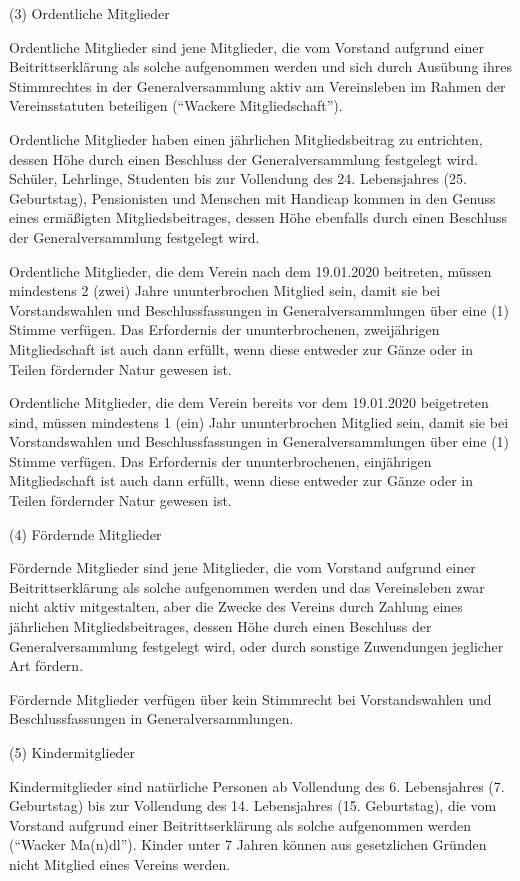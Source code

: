 \documentclass[11pt,a4paper]{article}
\begin{document}
(3)
Ordentliche Mitglieder

Ordentliche Mitglieder sind jene Mitglieder, die vom Vorstand aufgrund einer Beitrittserklärung als solche aufgenommen werden und sich durch Ausübung ihres Stimmrechtes in der Generalversammlung aktiv am Vereinsleben im Rahmen der Vereinsstatuten beteiligen ("`Wackere Mitgliedschaft"').

Ordentliche Mitglieder haben einen jährlichen Mitgliedsbeitrag zu entrichten, dessen Höhe durch einen Beschluss der Generalversammlung festgelegt wird.
Schüler, Lehrlinge, Studenten bis zur Vollendung des 24. Lebensjahres (25. Geburtstag), Pensionisten und Menschen mit Handicap kommen in den Genuss eines ermäßigten Mitgliedsbeitrages, dessen Höhe ebenfalls durch einen Beschluss der Generalversammlung festgelegt wird.

Ordentliche Mitglieder, die dem Verein nach dem 19.01.2020 beitreten, müssen mindestens 2 (zwei) Jahre ununterbrochen Mitglied sein, damit sie bei Vorstandswahlen und Beschlussfassungen in Generalversammlungen über eine (1) Stimme verfügen.
Das Erfordernis der ununterbrochenen, zweijährigen Mitgliedschaft ist auch dann erfüllt, wenn diese entweder zur Gänze oder in Teilen fördernder Natur gewesen ist.

Ordentliche Mitglieder, die dem Verein bereits vor dem 19.01.2020 beigetreten sind, müssen mindestens 1 (ein) Jahr ununterbrochen Mitglied sein, damit sie bei Vorstandswahlen und Beschlussfassungen in Generalversammlungen über eine (1) Stimme verfügen.
Das Erfordernis der ununterbrochenen, einjährigen Mitgliedschaft ist auch dann erfüllt, wenn diese entweder zur Gänze oder in Teilen fördernder Natur gewesen ist.

(4)
Fördernde Mitglieder

Fördernde Mitglieder sind jene Mitglieder, die vom Vorstand aufgrund einer Beitrittserklärung als solche aufgenommen werden und das Vereinsleben zwar nicht aktiv mitgestalten, aber die Zwecke des Vereins durch Zahlung eines jährlichen Mitgliedsbeitrages, dessen Höhe durch einen Beschluss der Generalversammlung festgelegt wird, oder durch sonstige Zuwendungen jeglicher Art fördern.

Fördernde Mitglieder verfügen über kein Stimmrecht bei Vorstandswahlen und Beschlussfassungen in Generalversammlungen.

(5)
Kindermitglieder

Kindermitglieder sind natürliche Personen ab Vollendung des 6. Lebensjahres (7. Geburtstag) bis zur Vollendung des 14. Lebensjahres (15. Geburtstag), die vom Vorstand aufgrund einer Beitrittserklärung als solche aufgenommen werden ("`Wacker Ma(n)dl"').
Kinder unter 7 Jahren können aus gesetzlichen Gründen nicht Mitglied eines Vereins werden.
\end{document}
